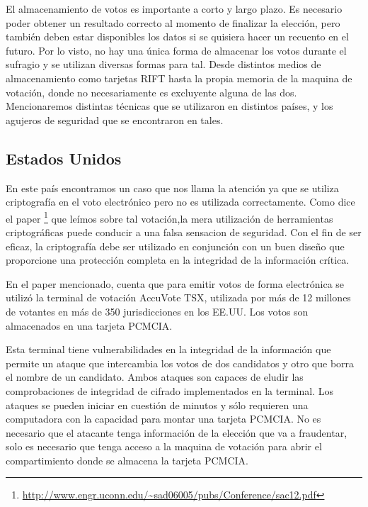 El almacenamiento de votos es importante a corto y largo plazo. Es necesario poder obtener un resultado correcto al momento de finalizar la elección, pero también deben estar disponibles los datos si se quisiera hacer un recuento en el futuro. 
Por lo visto, no hay una única forma de almacenar los votos durante el sufragio y se utilizan diversas formas para tal. Desde distintos medios de almacenamiento como tarjetas RIFT hasta la propia memoria de la maquina de votación, donde no necesariamente es excluyente alguna de las dos.  
Mencionaremos distintas técnicas que se utilizaron en distintos países, y los agujeros de seguridad que se encontraron en tales.

\subsection{Estados Unidos}
En este país encontramos un caso que nos llama la atención ya que se utiliza criptografía en el voto electrónico pero no es utilizada correctamente. Como dice el paper 
\footnote{\url{http://www.engr.uconn.edu/~sad06005/pubs/Conference/sac12.pdf}}
que leímos sobre tal votación,la mera utilización de herramientas criptográficas puede conducir a una falsa sensacion de seguridad. Con el fin de ser eficaz, la criptografía debe ser utilizado en conjunción con un buen diseño que proporcione una protección completa en la integridad de la información crítica.

En el paper mencionado, cuenta que para emitir votos de forma electrónica se utilizó la terminal de votación AccuVote TSX, utilizada por más de 12 millones de votantes en más de 350 jurisdicciones en los EE.UU.  Los votos son almacenados en una tarjeta PCMCIA.

Esta terminal tiene vulnerabilidades en la integridad de la información que permite un ataque que intercambia los votos de dos candidatos y otro que borra el nombre de un candidato. Ambos ataques son capaces de eludir las comprobaciones de integridad de cifrado implementados en la terminal. Los ataques se pueden iniciar en cuestión de minutos y sólo requieren una computadora con la capacidad para montar una tarjeta PCMCIA. No es necesario que el atacante tenga información de la elección que va a fraudentar, solo es necesario que tenga acceso a la maquina de votación para abrir el compartimiento donde se almacena la tarjeta PCMCIA.

